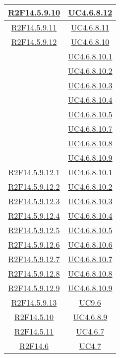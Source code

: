 \begin{longtable}{|c|c|}
\hline
\hyperlink{R2F14.5.9.10}{R2F14.5.9.10} & \hyperlink{UC4.6.8.12}{UC4.6.8.12}\\
\hline
\hyperlink{R2F14.5.9.11}{R2F14.5.9.11} & \hyperlink{UC4.6.8.11}{UC4.6.8.11}\\
\hline
\hyperlink{R2F14.5.9.12}{R2F14.5.9.12} & \hyperlink{UC4.6.8.10}{UC4.6.8.10}\\
& \hyperlink{UC4.6.8.10.1}{UC4.6.8.10.1}\\
& \hyperlink{UC4.6.8.10.2}{UC4.6.8.10.2}\\
& \hyperlink{UC4.6.8.10.3}{UC4.6.8.10.3}\\
& \hyperlink{UC4.6.8.10.4}{UC4.6.8.10.4}\\
& \hyperlink{UC4.6.8.10.5}{UC4.6.8.10.5}\\
& \hyperlink{UC4.6.8.10.7}{UC4.6.8.10.7}\\
& \hyperlink{UC4.6.8.10.8}{UC4.6.8.10.8}\\
& \hyperlink{UC4.6.8.10.9}{UC4.6.8.10.9}\\
\hline
\hyperlink{R2F14.5.9.12.1}{R2F14.5.9.12.1} & \hyperlink{UC4.6.8.10.1}{UC4.6.8.10.1}\\
\hline
\hyperlink{R2F14.5.9.12.2}{R2F14.5.9.12.2} & \hyperlink{UC4.6.8.10.2}{UC4.6.8.10.2}\\
\hline
\hyperlink{R2F14.5.9.12.3}{R2F14.5.9.12.3} & \hyperlink{UC4.6.8.10.3}{UC4.6.8.10.3}\\
\hline
\hyperlink{R2F14.5.9.12.4}{R2F14.5.9.12.4} & \hyperlink{UC4.6.8.10.4}{UC4.6.8.10.4}\\
\hline
\hyperlink{R2F14.5.9.12.5}{R2F14.5.9.12.5} & \hyperlink{UC4.6.8.10.5}{UC4.6.8.10.5}\\
\hline
\hyperlink{R2F14.5.9.12.6}{R2F14.5.9.12.6} & \hyperlink{UC4.6.8.10.6}{UC4.6.8.10.6}\\
\hline
\hyperlink{R2F14.5.9.12.7}{R2F14.5.9.12.7} & \hyperlink{UC4.6.8.10.7}{UC4.6.8.10.7}\\
\hline
\hyperlink{R2F14.5.9.12.8}{R2F14.5.9.12.8} & \hyperlink{UC4.6.8.10.8}{UC4.6.8.10.8}\\
\hline
\hyperlink{R2F14.5.9.12.9}{R2F14.5.9.12.9} & \hyperlink{UC4.6.8.10.9}{UC4.6.8.10.9}\\
\hline
\hyperlink{R2F14.5.9.13}{R2F14.5.9.13} & \hyperlink{UC9.6}{UC9.6}\\
\hline
\hyperlink{R2F14.5.10}{R2F14.5.10} & \hyperlink{UC4.6.8.9}{UC4.6.8.9}\\
\hline
\hyperlink{R2F14.5.11}{R2F14.5.11} & \hyperlink{UC4.6.7}{UC4.6.7}\\
\hline
\hyperlink{R2F14.6}{R2F14.6} & \hyperlink{UC4.7}{UC4.7}\\

\end{longtable}
